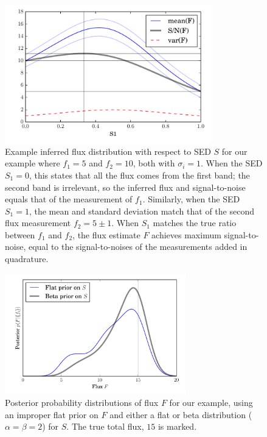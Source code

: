 \documentclass[letterpaper,preprint]{aastex}
\begin{document}
\begin{figure}
\begin{center}
\includegraphics[width=0.8\textwidth]{bayes-00}
\end{center}
\caption{Example inferred flux distribution with respect to SED $S$
  for our example where $f_1 = 5$ and $f_2 = 10$, both with $\sigma_i
  = 1$.  When the SED $S_1 = 0$, this states that all the flux comes
  from the first band; the second band is irrelevant, so the inferred
  flux and signal-to-noise equals that of the measurement of $f_1$.
  Similarly, when the SED $S_1 = 1$, the mean and standard deviation
  match that of the second flux measurement $f_2 = 5 \pm 1$.  When
  $S_1$ matches the true ratio between $f_1$ and $f_2$, the flux
  estimate $F$ achieves maximum signal-to-noise, equal to the
  signal-to-noises of the measurements added in quadrature.
  \label{example}}
\end{figure}


\begin{figure}[p!]
\begin{center}
\includegraphics[width=0.7\textwidth]{bayes-01}
\end{center}
\caption{Posterior probability distributions of flux $F$ for our
  example, using an improper flat prior on $F$ and either a flat or
  beta distribution ($\alpha = \beta = 2$) for $S$.  The true total
  flux, $15$ is marked.
  \label{postflux}}
\end{figure}
\end{document}
